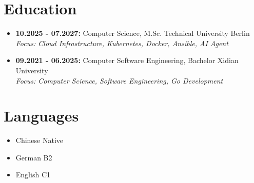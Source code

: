 \documentclass[10pt,a4paper]{article}
\newcommand{\cvright}[1]{\hfill{\normalfont #1}}
\newcommand{\cvedu}[4]{%
  \item \textbf{#1:} #2 \cvright{#3}\\
  \textit{Focus: #4}
}
\begin{document}
\section*{Education}
\begin{itemize}
  \cvedu{10.2025 - 07.2027}{Computer Science, M.Sc.}{Technical University Berlin}{Cloud Infrastructure, Kubernetes, Docker, Ansible, AI Agent}
  \cvedu{09.2021 - 06.2025}{Computer Software Engineering, Bachelor}{Xidian University}{Computer Science, Software Engineering, Go Development}
\end{itemize}

\section*{Languages}
\begin{itemize}
  \item Chinese \cvright{Native}
  \item German \cvright{B2}
  \item English \cvright{C1}
\end{itemize}
\end{document}
